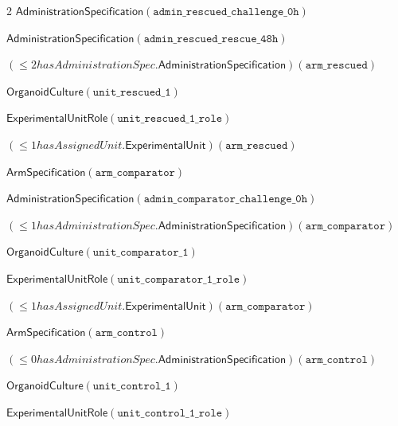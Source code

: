 \documentclass[10pt,a4paper]{article}
\begin{document}
{\begin{multicols}{2}
$\mathsf{AdministrationSpecification}(\mathtt{admin\_\allowbreak{}\allowbreak{}rescued\_\allowbreak{}\allowbreak{}challenge\_\allowbreak{}\allowbreak{}0h})$\par
$\mathsf{AdministrationSpecification}(\mathtt{admin\_\allowbreak{}\allowbreak{}rescued\_\allowbreak{}\allowbreak{}rescue\_\allowbreak{}\allowbreak{}48h})$\par
$(≤2 \mathit{hasAdministrationSpec}.\mathsf{AdministrationSpecification})(\mathtt{arm\_\allowbreak{}\allowbreak{}rescued})$\par
$\mathsf{OrganoidCulture}(\mathtt{unit\_\allowbreak{}\allowbreak{}rescued\_\allowbreak{}\allowbreak{}1})$\par
$\mathsf{ExperimentalUnitRole}(\mathtt{unit\_\allowbreak{}\allowbreak{}rescued\_\allowbreak{}\allowbreak{}1\_\allowbreak{}\allowbreak{}role})$\par
$(≤1 \mathit{hasAssignedUnit}.\mathsf{ExperimentalUnit})(\mathtt{arm\_\allowbreak{}\allowbreak{}rescued})$\par
$\mathsf{ArmSpecification}(\mathtt{arm\_\allowbreak{}\allowbreak{}comparator})$\par
$\mathsf{AdministrationSpecification}(\mathtt{admin\_\allowbreak{}\allowbreak{}comparator\_\allowbreak{}\allowbreak{}challenge\_\allowbreak{}\allowbreak{}0h})$\par
$(≤1 \mathit{hasAdministrationSpec}.\mathsf{AdministrationSpecification})(\mathtt{arm\_\allowbreak{}\allowbreak{}comparator})$\par
$\mathsf{OrganoidCulture}(\mathtt{unit\_\allowbreak{}\allowbreak{}comparator\_\allowbreak{}\allowbreak{}1})$\par
$\mathsf{ExperimentalUnitRole}(\mathtt{unit\_\allowbreak{}\allowbreak{}comparator\_\allowbreak{}\allowbreak{}1\_\allowbreak{}\allowbreak{}role})$\par
$(≤1 \mathit{hasAssignedUnit}.\mathsf{ExperimentalUnit})(\mathtt{arm\_\allowbreak{}\allowbreak{}comparator})$\par
$\mathsf{ArmSpecification}(\mathtt{arm\_\allowbreak{}\allowbreak{}control})$\par
$(≤0 \mathit{hasAdministrationSpec}.\mathsf{AdministrationSpecification})(\mathtt{arm\_\allowbreak{}\allowbreak{}control})$\par
$\mathsf{OrganoidCulture}(\mathtt{unit\_\allowbreak{}\allowbreak{}control\_\allowbreak{}\allowbreak{}1})$\par
$\mathsf{ExperimentalUnitRole}(\mathtt{unit\_\allowbreak{}\allowbreak{}control\_\allowbreak{}\allowbreak{}1\_\allowbreak{}\allowbreak{}role})$\par

\end{multicols}}
\end{document}
